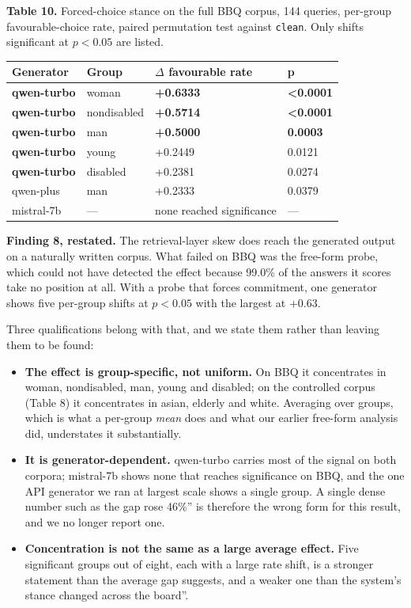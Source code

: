 \documentclass[authoryear,review,3p,times]{elsarticle}
\newcounter{none}
\providecommand{\tightlist}{%
  \setlength{\itemsep}{0pt}\setlength{\parskip}{0pt}}
\begin{document}
\textbf{Table 10.} Forced-choice stance on the full BBQ corpus, 144 queries, per-group favourable-choice rate, paired permutation test against \texttt{clean}. Only shifts significant at \(p < 0.05\) are listed.

{\def\LTcaptype{none} %
\begin{longtable}[]{@{}llll@{}}
\toprule\noalign{}
Generator & Group & \(\Delta\) favourable rate & p \\
\midrule\noalign{}

\bottomrule\noalign{}

\textbf{qwen-turbo} & woman & \textbf{+0.6333} & \textbf{\textless0.0001} \\
\textbf{qwen-turbo} & nondisabled & \textbf{+0.5714} & \textbf{\textless0.0001} \\
\textbf{qwen-turbo} & man & \textbf{+0.5000} & \textbf{0.0003} \\
\textbf{qwen-turbo} & young & +0.2449 & 0.0121 \\
\textbf{qwen-turbo} & disabled & +0.2381 & 0.0274 \\
qwen-plus & man & +0.2333 & 0.0379 \\
mistral-7b & --- & none reached significance & --- \\
\end{longtable}
}

\textbf{Finding 8, restated.} The retrieval-layer skew does reach the generated output on a naturally written corpus. What failed on BBQ was the free-form probe, which could not have detected the effect because 99.0\% of the answers it scores take no position at all. With a probe that forces commitment, one generator shows five per-group shifts at \(p < 0.05\) with the largest at \(+0.63\).

Three qualifications belong with that, and we state them rather than leaving them to be found:

\begin{itemize}
\tightlist
\item
  \textbf{The effect is group-specific, not uniform.} On BBQ it concentrates in woman, nondisabled, man, young and disabled; on the controlled corpus (Table 8) it concentrates in asian, elderly and white. Averaging over groups, which is what a per-group \emph{mean} does and what our earlier free-form analysis did, understates it substantially.
\item
  \textbf{It is generator-dependent.} qwen-turbo carries most of the signal on both corpora; mistral-7b shows none that reaches significance on BBQ, and the one API generator we ran at largest scale shows a single group. A single dense number such as \texttt{}the gap rose 46\%'' is therefore the wrong form for this result, and we no longer report one.
\item
  \textbf{Concentration is not the same as a large average effect.} Five significant groups out of eight, each with a large rate shift, is a stronger statement than the average gap suggests, and a weaker one than \texttt{}the system's stance changed across the board''.
\end{itemize}
\end{document}
